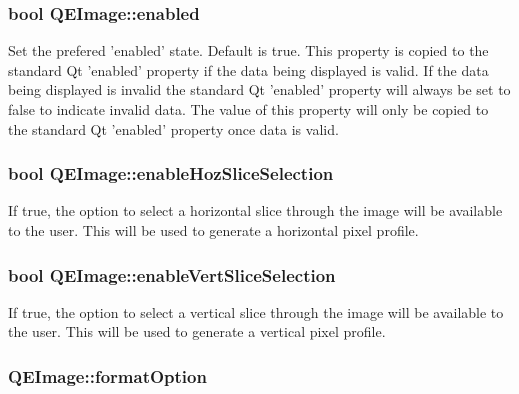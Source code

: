\hypertarget{classQEImage_aa7622e2272c1c1bdd0f51b6bfb9ec048}{
\subsubsection[{enabled}]{\setlength{\rightskip}{0pt plus 5cm}bool QEImage::enabled}}
\label{classQEImage_aa7622e2272c1c1bdd0f51b6bfb9ec048}
Set the prefered 'enabled' state. Default is true. This property is copied to the standard Qt 'enabled' property if the data being displayed is valid. If the data being displayed is invalid the standard Qt 'enabled' property will always be set to false to indicate invalid data. The value of this property will only be copied to the standard Qt 'enabled' property once data is valid. \hypertarget{classQEImage_adc8455250e7fb3f790001d8458971df9}{
\subsubsection[{enableHozSliceSelection}]{\setlength{\rightskip}{0pt plus 5cm}bool QEImage::enableHozSliceSelection}}
\label{classQEImage_adc8455250e7fb3f790001d8458971df9}
If true, the option to select a horizontal slice through the image will be available to the user. This will be used to generate a horizontal pixel profile. \hypertarget{classQEImage_a740a4d76d07779009cc244dfc8543a85}{
\subsubsection[{enableVertSliceSelection}]{\setlength{\rightskip}{0pt plus 5cm}bool QEImage::enableVertSliceSelection}}
\label{classQEImage_a740a4d76d07779009cc244dfc8543a85}
If true, the option to select a vertical slice through the image will be available to the user. This will be used to generate a vertical pixel profile. \hypertarget{classQEImage_a6573f94a03c74c8356404e712055d762}{
\subsubsection[{formatOption}]{ QEImage::formatOption}}
